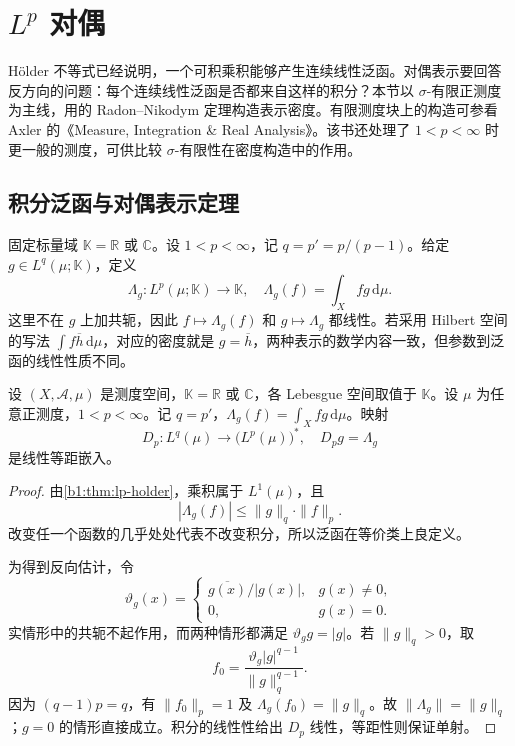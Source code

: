\section{\texorpdfstring{\(L^p\)}{Lᵖ} 对偶}
\label{b1:sec:1003}

Hölder 不等式已经说明，一个可积乘积能够产生连续线性泛函。对偶表示要回答反方向的问题：每个连续线性泛函是否都来自这样的积分？本节以 \(\sigma\)-有限正测度为主线，用的 Radon--Nikodym 定理构造表示密度。有限测度块上的构造可参看 Axler 的《Measure, Integration \& Real Analysis》\cite[Section 7B; 9.42 dual space of \(L^p(\mu)\) is \(L^{p'}(\mu)\)]{Axler2020Measure}。该书还处理了 \(1<p<\infty\) 时更一般的测度，可供比较 \(\sigma\)-有限性在密度构造中的作用。


\subsection{积分泛函与对偶表示定理}
\label{b1:subsec:100301}

固定标量域 \(\mathbb K=\mathbb R\) 或 \(\mathbb C\)。设 \(1<p<\infty\)，记 \(q=p'=p/(p-1)\)。给定 \(g\in L^q(\mu;\mathbb K)\)，定义
\[
 \Lambda_g:L^p(\mu;\mathbb K)\longrightarrow\mathbb K,
 \quad \Lambda_g(f)=\int_Xfg\,\mathrm d\mu.
\]
这里不在 \(g\) 上加共轭，因此 \(f\mapsto\Lambda_g(f)\) 和 \(g\mapsto\Lambda_g\) 都线性。若采用 Hilbert 空间的写法 \(\int f\overline h\,\mathrm d\mu\)，对应的密度就是 \(g=\overline h\)，两种表示的数学内容一致，但参数到泛函的线性性质不同。

\begin{proposition}\label{b1:prop:lp-dual-isometry}
设 \((X,\mathcal A,\mu)\) 是测度空间，\(\mathbb K=\mathbb R\) 或 \(\mathbb C\)，各 Lebesgue 空间取值于 \(\mathbb K\)。设 \(\mu\) 为任意正测度，\(1<p<\infty\)。记 \(q=p'\)，\(\Lambda_g(f)=\int_Xfg\,\mathrm d\mu\)。映射
\[
 D_p:L^q(\mu)\longrightarrow \bigl(L^p(\mu)\bigr)^*,
 \quad D_pg=\Lambda_g
\]
是线性等距嵌入。
\end{proposition}
\begin{proof}
由\cref{b1:thm:lp-holder}，乘积属于 \(L^1(\mu)\)，且
\[
 |\Lambda_g(f)|\le\|g\|_q\cdot\|f\|_p.
\]
改变任一个函数的几乎处处代表不改变积分，所以泛函在等价类上良定义。

为得到反向估计，令
\[
 \vartheta_g(x)=
 \begin{cases}
  \overline{g(x)}/|g(x)|,&g(x)\ne0,\\
  0,&g(x)=0.
 \end{cases}
\]
实情形中的共轭不起作用，而两种情形都满足 \(\vartheta_gg=|g|\)。若 \(\|g\|_q>0\)，取
\[
 f_0=\dfrac{\vartheta_g|g|^{q-1}}{\|g\|_q^{q-1}}.
\]
因为 \((q-1)p=q\)，有 \(\|f_0\|_p=1\) 及
\(\Lambda_g(f_0)=\|g\|_q\)。故 \(\|\Lambda_g\|=\|g\|_q\)；\(g=0\) 的情形直接成立。积分的线性性给出 \(D_p\) 线性，等距性则保证单射。
\end{proof}


